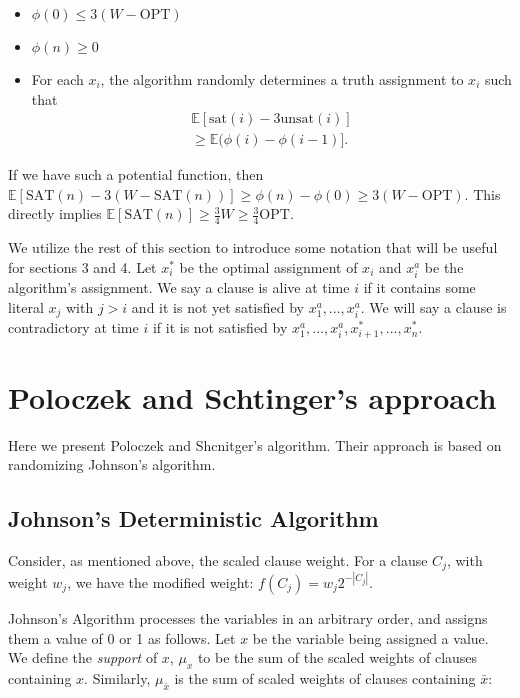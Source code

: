 \documentclass[11pt,letter]{article}
\begin{document}
\begin{itemize}
	\item $\phi(0) \leq 3(W-\mathrm{OPT})$
	\item $\phi(n) \geq 0$
	\item For each $x_i$, the algorithm randomly determines a truth assignment to $x_i$ such that
\begin{equation}
\begin{aligned}
\label{eq:2}
\mathbb{E}[\mathrm{sat}(i) - 3\mathrm{unsat}(i)] \\
\geq \mathbb{E}(\phi(i) - \phi(i-1)].
\end{aligned}
\end{equation}
\end{itemize}

If we have such a potential function, then $\mathbb{E}[\mathrm{SAT}(n)- 3\left(W-\mathrm{SAT}(n)\right)] \geq \phi(n) - \phi(0) \geq 3(W-\mathrm{OPT})$.
This directly implies $\mathbb{E}[\mathrm{SAT}(n)] \geq \frac{3}{4} W \geq \frac{3}{4} \mathrm{OPT}$.

We utilize the rest of this section to introduce some notation that will be useful for sections 3 and 4.
Let $x_i^*$ be the optimal assignment of $x_i$ and $x_i^{a}$ be the algorithm's assignment. We say a clause is alive
at time $i$ if it contains some literal $x_j$ with $j > i$ and it is not yet satisfied by $x_1^a,...,x_i^a$.
We will say a clause is contradictory at time $i$ if it is not satisfied by $x_1^a,...,x_i^a,x_{i+1}^*,...,x_n^*$.


\section{Poloczek and Schtinger's approach}\label{S:PS}

Here we present Poloczek and Shcnitger's algorithm. Their approach is based on randomizing Johnson's algorithm.

\subsection{Johnson's Deterministic Algorithm}

Consider, as mentioned above, the scaled clause weight. For a clause $C_j$, with weight $w_j$, we have the modified weight:  $f(C_j) = w_j 2^{-|C_j|}$.

Johnson's Algorithm processes the variables in an arbitrary order, and assigns them a value of 0 or 1 as follows. Let $x$ be the variable being assigned a value. We define the \emph{support} of $x$, $\mu_x$ to be the sum of the scaled weights of clauses containing $x$. Similarly, $\mu_{\bar{x}}$ is the sum of scaled weights of clauses containing $\bar{x}$:
\end{document}
